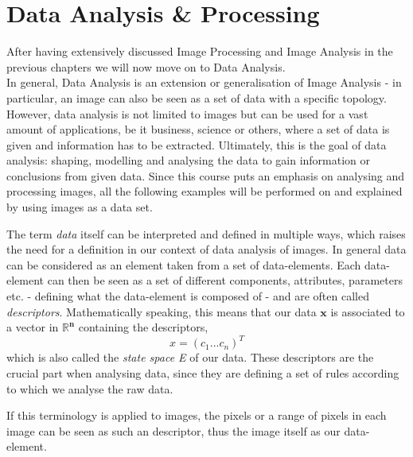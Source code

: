 \section{Data Analysis \& Processing}
After having extensively discussed Image Processing and Image Analysis in the previous chapters we will now move on to Data Analysis. \\In general, Data Analysis is an extension or generalisation of Image Analysis - in particular, an image can also be seen as a set of data with a specific topology. However, data analysis is not limited to images but can be used for a vast amount of applications, be it business, science or others, where a set of data is given and information has to be extracted. Ultimately, this is the goal of data analysis: shaping, modelling and analysing the data to gain information or conclusions from given data.
Since this course puts an emphasis on analysing and processing images, all the following examples will be performed on and explained by using images as a data set.

The term \textit{data} itself can be interpreted and defined in multiple ways, which raises the need for a definition in our context of data analysis of images.
In general data can be considered as an element taken from a set of data-elements. Each data-element can then be seen as a set of different components, attributes, parameters etc. - defining what the data-element is composed of - and are often called \textit{descriptors}. Mathematically speaking, this means that our data $\boldsymbol{x}$ is associated to a vector in $\boldsymbol{\mathbb{R}^n}$ containing the descriptors,
\begin{equation*}
	x = (c_1 ... c_n)^T
\end{equation*}
which is also called the \textit{state space E} of our data.
These descriptors are the crucial part when analysing data, since they are defining a set of rules according to which we analyse the raw data.

If this terminology is applied to images, the pixels or a range of pixels in each image can be seen as such an descriptor, thus the image itself as our data-element.

